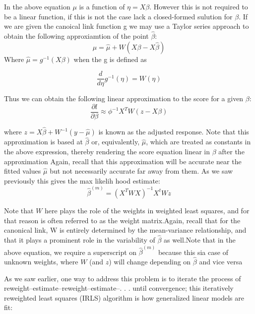 \documentclass{article}
\begin{document}
    In the above equation $\mu$ is a function of $\eta = X \beta$. However this is not required to be a linear function, if this is not the case lack a closed-formed sulution for $\beta$. If we are given the canoical link function g we may use a Taylor series approach to obtain the following approxiamtion of the point $\widehat{\beta}$:
    \begin{equation} \mu = \widehat{\mu} + W(X\beta - X \widehat{\beta}) \end{equation}
    Where $\widehat{\mu} = g^{-1}(X\beta) $ when the g is defined as

    \begin{equation} \frac{d}{d\eta} g^{-1}(\eta) = W(\eta) \end{equation}

    Thus we can obtain the following linear approximation to the score for a given $\beta$:
    \begin{equation} \frac{\partial l}{\partial \beta} \approx \phi^{-1} X^TW(z-X\beta) \end{equation}

    where $z = X\widehat{\beta} + W^{-1} (y-\widehat{\mu})$ is known as the adjusted response. Note that this approximation is based at $\widehat{\beta}$ or, equivalently, $\widehat{\mu}$, which are treated as constants in the above expression, thereby rendering the score equation linear in $\beta$ after the approximation Again, recall that this approximation will be accurate near the fitted values $\widehat{\mu}$ but not necessarily accurate far away from them.
    As we saw previously this gives the max likelih hood estimate:
    \begin{equation} \widehat{\beta} ^{(m)} = (X^TWX)^{-1}X^tWz \end{equation}

    Note that $W$ here plays the role of the weights in weighted least squares, and for that reason is often referred to as the weight matrix.Again, recall that for the canonical link, W is entirely determined by the mean-variance relationship, and that it plays a prominent role in the variability of $\widehat{\beta}$ as well.Note that in the above equation, we require a superscript on $\widehat{\beta} ^{(m)}$ because this sia case of unknown weights, where $W$ (and $z$) will change depending on $\widehat{\beta}$ and vice versa


    As we saw earlier, one way to address this problem is to iterate the process of reweight–estimate–reweight–estimate–. . . until convergence; this iteratively reweighted least squares (IRLS) algorithm is how generalized linear models are fit:
\end{document}
